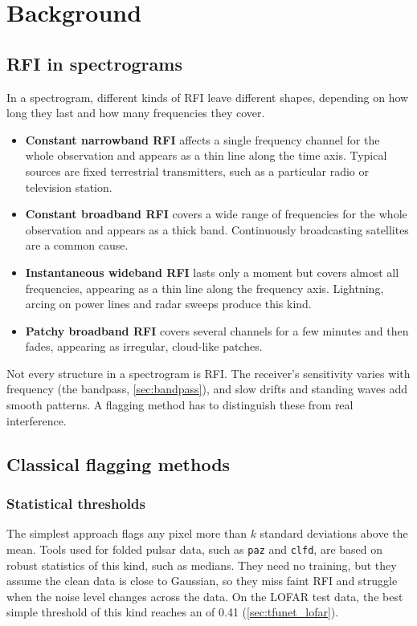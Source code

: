 \chapter{Background}
\label{ch:background}

\section{RFI in spectrograms}
\label{sec:rfi_types}
In a spectrogram, different kinds of RFI leave different shapes, depending on
how long they last and how many frequencies they cover.
\begin{itemize}
  \item \textbf{Constant narrowband RFI} affects a single frequency channel for
    the whole observation and appears as a thin line along the time axis.
    Typical sources are fixed terrestrial transmitters, such as a particular
    radio or television station.
  \item \textbf{Constant broadband RFI} covers a wide range of frequencies for the
    whole observation and appears as a thick band. Continuously broadcasting
    satellites are a common cause.
  \item \textbf{Instantaneous wideband RFI} lasts only a moment but covers almost
    all frequencies, appearing as a thin line along the frequency axis.
    Lightning, arcing on power lines and radar sweeps produce this kind.
  \item \textbf{Patchy broadband RFI} covers several channels for a few minutes
    and then fades, appearing as irregular, cloud-like patches.
\end{itemize}
Not every structure in a spectrogram is RFI. The receiver's sensitivity
varies with frequency (the bandpass, \cref{sec:bandpass}), and slow drifts and
standing waves add smooth patterns. A flagging method has to distinguish these
from real interference.

\section{Classical flagging methods}

\subsection{Statistical thresholds}
The simplest approach flags any pixel more than $k$ standard deviations above
the mean. Tools used for folded pulsar data, such as \texttt{paz} and
\texttt{clfd}, are based on robust statistics of this kind, such as medians.
They need no training, but they assume the clean data is close to Gaussian, so
they miss faint RFI and struggle when the noise level changes across the data.
On the LOFAR test data, the best simple threshold of this kind reaches an
\Fone{} of 0.41 (\cref{sec:tfunet_lofar}).

